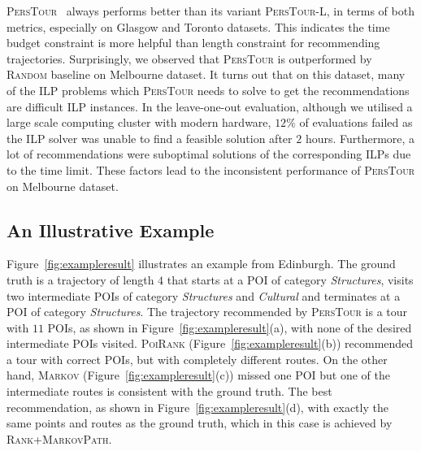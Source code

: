 \textsc{PersTour}~\cite{ijcai15} always performs better than its variant \textsc{PersTour-L},
in terms of both metrics, especially on Glasgow and Toronto datasets.
This indicates the time budget constraint is more helpful than length constraint for recommending trajectories.
Surprisingly, we observed that \textsc{PersTour} is outperformed by \textsc{Random} baseline on Melbourne dataset. %
It turns out that on this dataset, many of the ILP problems
which \textsc{PersTour} needs to solve to get the recommendations are difficult ILP instances.
In the leave-one-out evaluation, although we utilised a large scale computing cluster with modern hardware,
$12\%$ of evaluations failed as the ILP solver was unable to find a feasible solution after $2$ hours.
Furthermore, a lot of recommendations were suboptimal solutions of the corresponding ILPs due to
the time limit. These factors lead to the inconsistent performance of \textsc{PersTour} on Melbourne dataset.

\secmoveup
\subsection{An Illustrative Example}
\label{sec:example}


Figure~\ref{fig:exampleresult} illustrates an example %
from Edinburgh.
The ground truth is a trajectory of length $4$ that starts at a POI of category \textit{Structures},
visits two intermediate POIs of category \textit{Structures} and \textit{Cultural} and
terminates at a POI of category \textit{Structures}.
The trajectory recommended by \textsc{PersTour} is a tour with $11$ POIs, as shown in Figure~\ref{fig:exampleresult}(a),
with none of the desired intermediate POIs visited.
\textsc{PoiRank} (Figure~\ref{fig:exampleresult}(b)) recommended a tour with correct POIs,
but with completely different routes.
On the other hand, \textsc{Markov} (Figure~\ref{fig:exampleresult}(c)) missed one POI
but one of the intermediate routes is consistent with the ground truth.
The best recommendation, as shown in Figure~\ref{fig:exampleresult}(d),
with exactly the same points and routes as the ground truth,
which in this case is achieved by \textsc{Rank+MarkovPath}.

